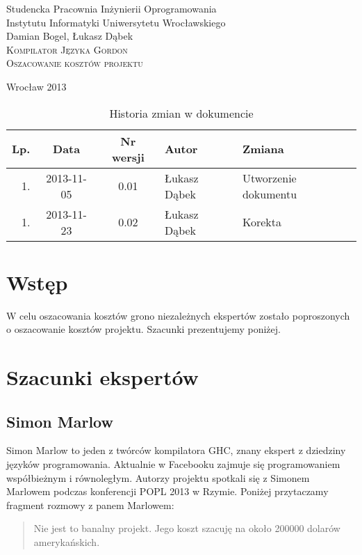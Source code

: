 \documentclass{documentation}
\begin{document}
\begin{titlepage}
\begin{center}
Studencka Pracownia Inżynierii Oprogramowania\\
Instytutu Informatyki Uniwersytetu Wrocławskiego\\[6cm]

Damian Bogel, Łukasz Dąbek\\[1cm]
\textsc{\LARGE Kompilator Języka Gordon}\\[0.5cm]
\textsc{\large Oszacowanie kosztów projektu}

\vfill
Wrocław 2013 \\[2.5cm]

\end{center}
\end{titlepage}

\newpage
\begin{table}
	\centering
    \captionsetup{name=Tabela,labelsep=period}
	\caption{Historia zmian w dokumencie}
		\begin{tabular}{|r|c|c|l|l|}
		\hline
		Lp.  & Data       & Nr wersji & Autor                 & Zmiana \\ \hline
		1.   & 2013-11-05 & 0.01 & Łukasz Dąbek & Utworzenie dokumentu \\ \hline
		1.   & 2013-11-23 & 0.02 & Łukasz Dąbek & Korekta             \\ \hline
	\end{tabular}
\end{table}
\newpage

\tableofcontents
\setcounter{page}{2}

\newpage

\section{Wstęp}
\noindent W celu oszacowania kosztów grono niezależnych ekspertów zostało poproszonych
o oszacowanie kosztów projektu. Szacunki prezentujemy poniżej.

\section{Szacunki ekspertów}
\subsection{Simon Marlow}
\noindent Simon Marlow to jeden z twórców kompilatora \textsc{GHC}, znany ekspert
z dziedziny języków programowania. Aktualnie w Facebooku zajmuje się programowaniem
współbieżnym i równoległym. Autorzy projektu spotkali się z Simonem Marlowem podczas
konferencji POPL 2013 w Rzymie. Poniżej przytaczamy fragment rozmowy z panem Marlowem:
\begin{quotation}
    Nie jest to banalny projekt. Jego koszt szacuję na około 200000 dolarów amerykańskich.
\end{quotation}
\end{document}
